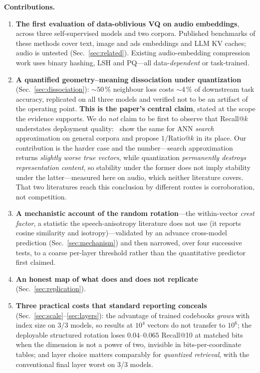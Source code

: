 \documentclass[conference]{IEEEtran}
\begin{document}
\textbf{Contributions.}
\begin{enumerate}
\item \textbf{The first evaluation of data-oblivious VQ on audio embeddings}, across three
self-supervised models and two corpora. Published benchmarks of these methods cover text, image and
ads embeddings and LLM KV caches; audio is untested (Sec.~\ref{sec:related}). Existing
audio-embedding compression work uses binary hashing, LSH and PQ---all data-\emph{dependent} or
task-trained.

\item \textbf{A quantified geometry--meaning dissociation under quantization}
(Sec.~\ref{sec:dissociation}): ${\sim}50\,\%$ neighbour loss costs ${\sim}4\,\%$ of downstream task
accuracy, replicated on all three models and verified not to be an artifact of the operating point.
\textbf{This is the paper's central claim}, stated at the scope the evidence supports. We do
\emph{not} claim to be first to observe that Recall@$k$ understates deployment
quality:~\cite{dimitropoulos2026} show the same for ANN \emph{search} approximation on general
corpora and propose $1/\mathrm{Ratio}@k$ in its place. Our contribution is the harder case and the
number---search approximation returns \emph{slightly worse true vectors}, while quantization
\emph{permanently destroys representation content}, so stability under the former does not imply
stability under the latter---measured here on audio, which neither literature covers. That two
literatures reach this conclusion by different routes is corroboration, not competition.

\item \textbf{A mechanistic account of the random rotation}---the within-vector \emph{crest
factor}, a statistic the speech-anisotropy literature does not use (it reports cosine similarity
and isotropy)---validated by an advance cross-model prediction (Sec.~\ref{sec:mechanism}) and then
narrowed, over four successive tests, to a coarse per-layer threshold rather than the quantitative
predictor first claimed.

\item \textbf{An honest map of what does and does not replicate} (Sec.~\ref{sec:replication}).

\item \textbf{Three practical costs that standard reporting conceals}
(Sec.~\ref{sec:scale}--\ref{sec:layers}): the advantage of trained codebooks \emph{grows} with
index size on 3/3 models, so results at $10^4$ vectors do not transfer to $10^6$; the deployable
structured rotation loses $0.04$--$0.065$ Recall@10 at matched bits when the dimension is not a
power of two, invisible in bits-per-coordinate tables; and layer choice matters comparably for
\emph{quantized retrieval}, with the conventional final layer worst on 3/3 models.
\end{enumerate}
\end{document}
